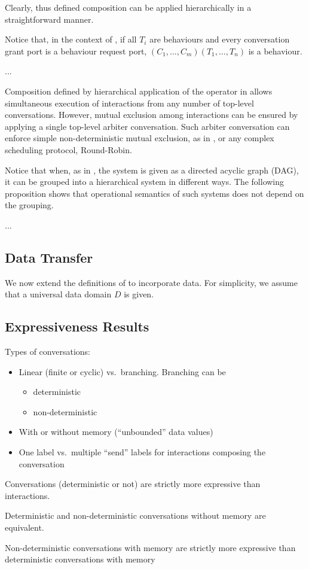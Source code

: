 Clearly, thus defined composition can be applied hierarchically in a
straightforward manner.  

Notice that, in the context of , if all $T_i$ are
behaviours and every conversation grant port is a behaviour request port,
$(C_1, \dots, C_m)(T_1, \dots, T_n)$ is a behaviour.

\begin{example}
  \label{ex:network}
  ...
\end{example}

Composition defined by hierarchical application of the operator in
 allows simultaneous execution of interactions from
any number of top-level conversations.  However, mutual exclusion among
interactions can be ensured by applying a single top-level arbiter
conversation.  Such arbiter conversation can enforce simple
non-deterministic mutual exclusion, as in , or any complex
scheduling protocol, \eg Round-Robin.

Notice that when, as in , the system is given as a directed
acyclic graph (DAG), it can be grouped into a hierarchical system in
different ways.  The following proposition shows that operational semantics
of such systems does not depend on the grouping.

\begin{proposition}
  ...
\end{proposition}


\subsection{Data Transfer}
\label{sec:data}

We now extend the definitions of  to incorporate data.
For simplicity, we assume that a universal data domain $D$ is given.



\subsection{Expressiveness Results}
\label{sec:expressiveness}


Types of conversations:
\begin{itemize}
\item Linear (finite or cyclic) vs.\ branching.  Branching can be
  \begin{itemize}
  \item deterministic
  \item non-deterministic
  \end{itemize}
\item With or without memory (``unbounded'' data values)
\item One label vs.\ multiple ``send'' labels for interactions composing
  the conversation
\end{itemize}

Conversations (deterministic or not) are strictly more expressive than
interactions.

Deterministic and non-deterministic conversations without memory are
equivalent.

Non-deterministic conversations with memory are strictly more expressive
than deterministic conversations with memory
